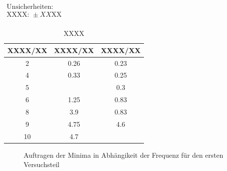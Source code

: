 \documentclass[11pt,a4paper]{article}
\begin{document}
\begin{table}[h]
\centering
\caption{XXXX} \vspace{11pt}
$\begin{array}{l}
\textrm{Unsicherheiten:}\\
\textrm{XXXX: } \pm XX \textrm{XX}\\
\end{array}$
\begin{tabular}{ccc}
\toprule
\textrm{XXXX}/\textrm{XX} & \textrm{XXXX}/\textrm{XX} & \textrm{XXXX}/\textrm{XX} \\
\midrule 
2 & 0.26 & 0.23\\
\hline
4 & 0.33 & 0.25\\
\hline 
5 & & 0.3\\
\hline 
6 & 1.25 & 0.83\\
\hline 
8 & 3.9 & 0.83\\ 
\hline
9 & 4.75 & 4.6\\ 
\hline
10 & 4.7 &\\ 
\bottomrule
\end{tabular}
\label{Tab:X}
\end{table}

\begin{figure}[p]
\centering
{}
\renewcommand\thefigure{3}
\caption[Auftragen der Minima in Abh\"angikeit der Frequenz f\"ur den ersten Versuchsteil]{Auftragen der Minima in Abh\"angikeit der Frequenz f\"ur den ersten Versuchsteil}
\label{Abb:3}
\end{figure}
\end{document}
